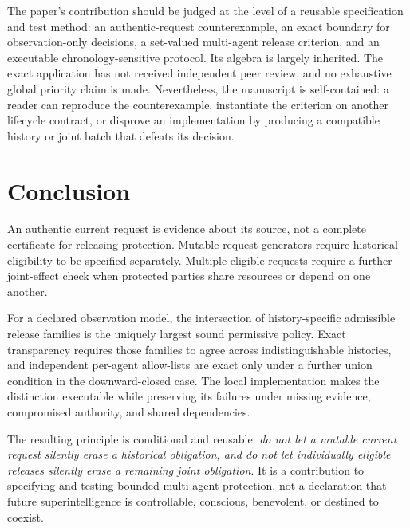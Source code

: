 The paper's contribution should be judged at the level of a reusable specification and test method: an authentic-request counterexample, an exact boundary for observation-only decisions, a set-valued multi-agent release criterion, and an executable chronology-sensitive protocol. Its algebra is largely inherited. The exact application has not received independent peer review, and no exhaustive global priority claim is made. Nevertheless, the manuscript is self-contained: a reader can reproduce the counterexample, instantiate the criterion on another lifecycle contract, or disprove an implementation by producing a compatible history or joint batch that defeats its decision.

\section{Conclusion}
An authentic current request is evidence about its source, not a complete certificate for releasing protection. Mutable request generators require historical eligibility to be specified separately. Multiple eligible requests require a further joint-effect check when protected parties share resources or depend on one another.

For a declared observation model, the intersection of history-specific admissible release families is the uniquely largest sound permissive policy. Exact transparency requires those families to agree across indistinguishable histories, and independent per-agent allow-lists are exact only under a further union condition in the downward-closed case. The local implementation makes the distinction executable while preserving its failures under missing evidence, compromised authority, and shared dependencies.

The resulting principle is conditional and reusable: \emph{do not let a mutable current request silently erase a historical obligation, and do not let individually eligible releases silently erase a remaining joint obligation}. It is a contribution to specifying and testing bounded multi-agent protection, not a declaration that future superintelligence is controllable, conscious, benevolent, or destined to coexist.

